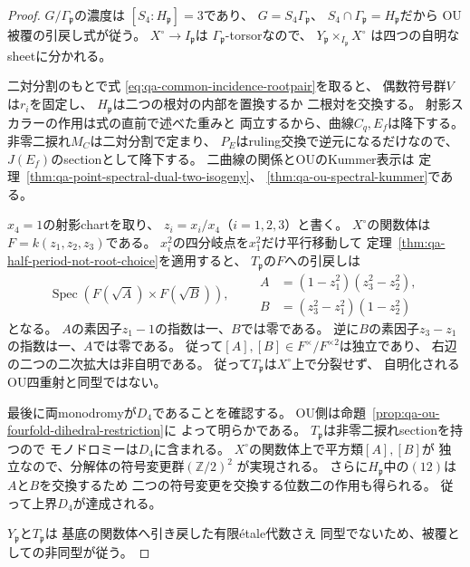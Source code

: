 \begin{proof}
$G/\Gamma_{\mathfrak p}$の濃度は
$[S_4:H_{\mathfrak p}]=3$であり、
$G=S_4\Gamma_{\mathfrak p}$、
$S_4\cap\Gamma_{\mathfrak p}=H_{\mathfrak p}$だから
OU被覆の引戻し式が従う。
$X^\circ\to I_{\mathfrak p}$は
$\Gamma_{\mathfrak p}$-torsorなので、
$Y_{\mathfrak p}\times_{I_{\mathfrak p}}X^\circ$
は四つの自明なsheetに分かれる。

二対分割のもとで式
\eqref{eq:qa-common-incidence-rootpair}を取ると、
偶数符号群$V$は$r_i$を固定し、
$H_{\mathfrak p}$は二つの根対の内部を置換するか
二根対を交換する。
射影スカラーの作用は式の直前で述べた重みと
両立するから、曲線$C_q,E_f$は降下する。
非零二捩れ$M_C$は二対分割で定まり、
$P_E$はruling交換で逆元になるだけなので、
$J(E_f)$のsectionとして降下する。
二曲線の関係とOUのKummer表示は
定理~\ref{thm:qa-point-spectral-dual-two-isogeny}、
\ref{thm:qa-ou-spectral-kummer}である。

$x_4=1$の射影chartを取り、
$z_i=x_i/x_4$（$i=1,2,3$）と書く。
$X^\circ$の関数体は$F=k(z_1,z_2,z_3)$である。
$x_i^2$の四分岐点を$x_1^2$だけ平行移動して
定理~\ref{thm:qa-half-period-not-root-choice}を適用すると、
$T_{\mathfrak p}$の$F$への引戻しは
\begin{equation}
 \operatorname{Spec}
 \left(F(\sqrt A)\times F(\sqrt B)\right),\qquad
 \begin{aligned}
 A&=(1-z_1^2)(z_3^2-z_2^2),\\
 B&=(z_3^2-z_1^2)(1-z_2^2)
 \end{aligned}
 \label{eq:qa-common-incidence-halfpoint-classes}
\end{equation}
となる。
$A$の素因子$z_1-1$の指数は一、$B$では零である。
逆に$B$の素因子$z_3-z_1$の指数は一、$A$では零である。
従って$[A],[B]\in F^\times/F^{\times2}$は独立であり、
右辺の二つの二次拡大は非自明である。
従って$T_{\mathfrak p}$は$X^\circ$上で分裂せず、
自明化されるOU四重射と同型ではない。

最後に両monodromyが$D_4$であることを確認する。
OU側は命題~\ref{prop:qa-ou-fourfold-dihedral-restriction}に
よって明らかである。
$T_{\mathfrak p}$は非零二捩れsectionを持つので
モノドロミーは$D_4$に含まれる。
$X^\circ$の関数体上で平方類$[A],[B]$が
独立なので、分解体の符号変更群$(\mathbb Z/2)^2$
が実現される。
さらに$H_{\mathfrak p}$中の$(12)$は
$A$と$B$を交換するため
二つの符号変更を交換する位数二の作用も得られる。
従って上界$D_4$が達成される。

$Y_{\mathfrak p}$と$T_{\mathfrak p}$は
基底の関数体へ引き戻した有限\'{e}tale代数さえ
同型でないため、被覆としての非同型が従う。
\end{proof}

